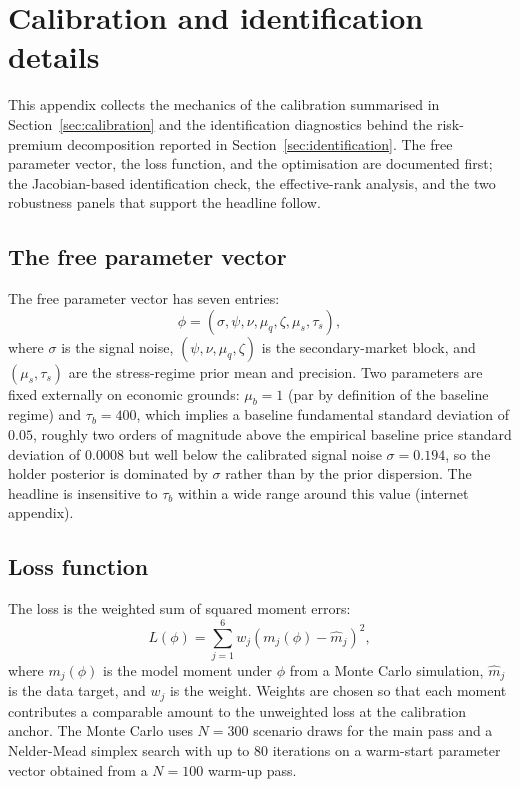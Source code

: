 \section{Calibration and identification details}\label{app:calib_details}

This appendix collects the mechanics of the calibration summarised in Section~\ref{sec:calibration} and the identification diagnostics behind the risk-premium decomposition reported in Section~\ref{sec:identification}. The free parameter vector, the loss function, and the optimisation are documented first; the Jacobian-based identification check, the effective-rank analysis, and the two robustness panels that support the headline follow.

\subsection{The free parameter vector}\label{sub:free_params}

The free parameter vector has seven entries:
\begin{equation}\label{eq:phi}
\phi = (\sigma, \psi, \nu, \mu_q, \zeta, \mu_s, \tau_s),
\end{equation}
where $\sigma$ is the signal noise, $(\psi, \nu, \mu_q, \zeta)$ is the secondary-market block, and $(\mu_s, \tau_s)$ are the stress-regime prior mean and precision. Two parameters are fixed externally on economic grounds: $\mu_b = 1$ (par by definition of the baseline regime) and $\tau_b = 400$, which implies a baseline fundamental standard deviation of $0.05$, roughly two orders of magnitude above the empirical baseline price standard deviation of $0.0008$ but well below the calibrated signal noise $\sigma = 0.194$, so the holder posterior is dominated by $\sigma$ rather than by the prior dispersion. The headline is insensitive to $\tau_b$ within a wide range around this value (internet appendix).

\subsection{Loss function}\label{sub:loss}

The loss is the weighted sum of squared moment errors:
\begin{equation}\label{eq:loss}
L(\phi) = \sum_{j=1}^{6} w_j (m_j(\phi) - \hat m_j)^2,
\end{equation}
where $m_j(\phi)$ is the model moment under $\phi$ from a Monte Carlo simulation, $\hat m_j$ is the data target, and $w_j$ is the weight. Weights are chosen so that each moment contributes a comparable amount to the unweighted loss at the calibration anchor. The Monte Carlo uses $N=300$ scenario draws for the main pass and a Nelder-Mead simplex search with up to 80 iterations on a warm-start parameter vector obtained from a $N=100$ warm-up pass.

